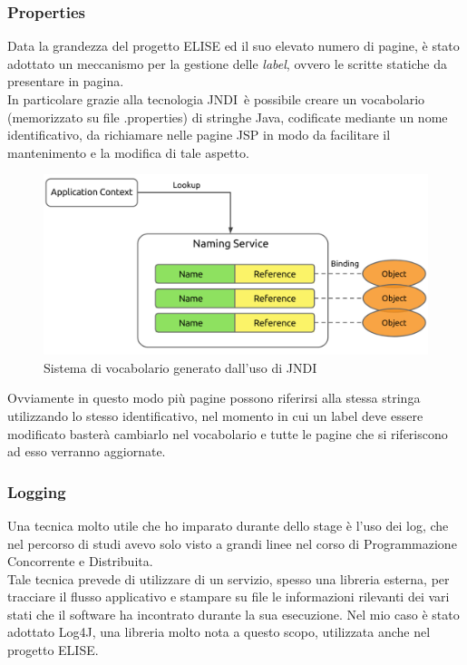 	\subsubsection{Properties}	
	Data la grandezza del progetto ELISE ed il suo elevato numero di pagine, è stato adottato un meccanismo per la gestione delle \textit{label}, ovvero le scritte statiche da presentare in pagina.\\
	
	In particolare grazie alla tecnologia JNDI\glossario\ è possibile creare un vocabolario (memorizzato su file .properties) di stringhe Java, codificate mediante un nome identificativo, da richiamare nelle pagine JSP in modo da facilitare il mantenimento e la modifica di tale aspetto.\\
	
	\begin{figure}[H]
		\centering
	   	\includegraphics[width=1\textwidth]{immagini/JNDI}
	   	\caption{Sistema di vocabolario generato dall'uso di JNDI}
	\end{figure}	
	
	Ovviamente in questo modo più pagine possono riferirsi alla stessa stringa utilizzando lo stesso identificativo, nel momento in cui un label deve essere modificato basterà cambiarlo nel vocabolario e tutte le pagine che si riferiscono ad esso verranno aggiornate.
	
	\subsubsection{Logging}	
	Una tecnica molto utile che ho imparato durante dello stage è l'uso dei log, che nel percorso di studi avevo solo visto a grandi linee nel corso di Programmazione Concorrente e Distribuita.\\
	
	Tale tecnica prevede di utilizzare di un servizio, spesso una libreria esterna, per tracciare il flusso applicativo e stampare su file le informazioni rilevanti dei vari stati che il software ha incontrato durante la sua esecuzione. Nel mio caso è stato adottato Log4J, una libreria molto nota a questo scopo, utilizzata anche nel progetto ELISE.\\
	
